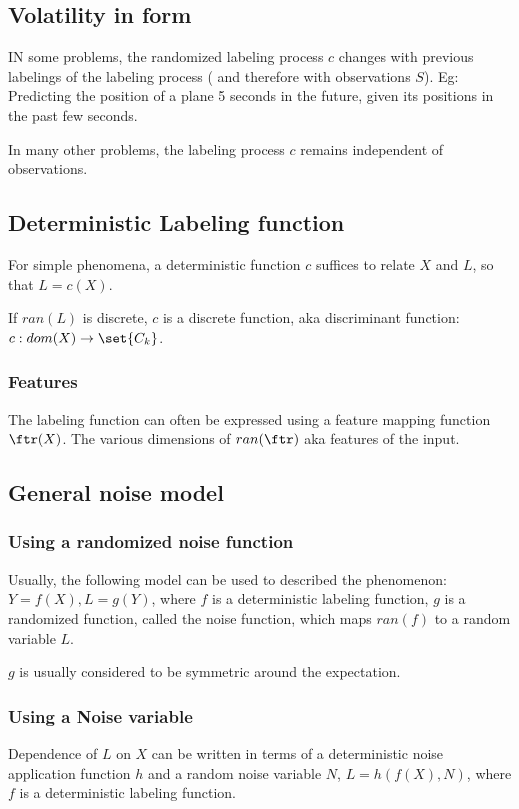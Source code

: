 \documentclass[oneside, article]{memoir}
\begin{document}
\subsection{Volatility in form}
IN some problems, the randomized labeling process $c$ changes with previous labelings of the labeling process ( and therefore with observations $S$). Eg: Predicting the position of a plane 5 seconds in the future, given its positions in the past few seconds.

In many other problems, the labeling process $c$ remains independent of observations.

\subsection{Deterministic Labeling function}
For simple phenomena, a deterministic function $c$ suffices to relate $X$ and $L$, so that $L = c(X)$.

If $ran(L)$ is discrete, $c$ is a discrete function, aka discriminant function: $c: dom(X) \to \set{C_{k}}$.

\subsubsection{Features}
The labeling function can often be expressed using a feature mapping function $\ftr(X)$. The various dimensions of $ran(\ftr)$ aka features of the input.

\subsection{General noise model}
\subsubsection{Using a randomized noise function}
Usually, the following model can be used to described the phenomenon: $Y = f(X), L = g(Y)$, where $f$ is a deterministic labeling function, $g$ is a randomized function, called the noise function, which maps $ran(f)$ to a random variable $L$.

$g$ is usually considered to be symmetric around the expectation.

\subsubsection{Using a Noise variable}
Dependence of $L$ on $X$ can be written in terms of a deterministic noise application function $h$ and a random noise variable $N$, $L = h(f(X), N)$, where $f$ is a deterministic labeling function.
\end{document}
